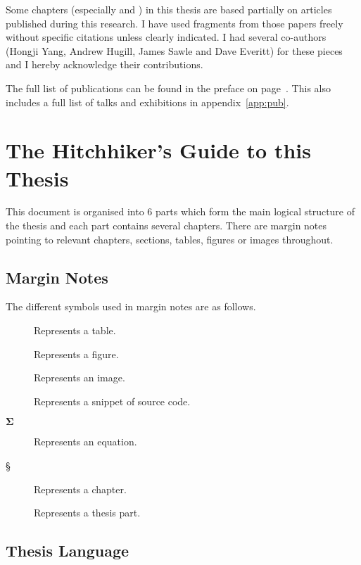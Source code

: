 Some chapters (especially  and ) in this thesis are based partially on articles published during this research. I have used fragments from those papers freely without specific citations unless clearly indicated. I had several co-authors (Hongji Yang, Andrew Hugill, James Sawle and Dave Everitt) for these pieces and I hereby acknowledge their contributions.

The full list of publications can be found in the preface on page~\pageref{pre:pub}. This also includes a full list of talks and exhibitions in appendix~\ref{app:pub}.


\section{The Hitchhiker's Guide to this Thesis}

This document is organised into \num{6} parts which form the main logical structure of the thesis and each part contains several chapters. There are margin notes pointing to relevant chapters, sections, tables, figures or images throughout.


\subsection{Margin Notes}

The different symbols used in margin notes are as follows.

\begin{description}
  \item [] Represents a table.
  \item [] Represents a figure.
  \item [] Represents an image.
  \item [] Represents a snippet of source code.
  \item [$\bm{\Sigma}$] Represents an equation.
  \item [§] Represents a chapter.
  \item [\textspiral] Represents a thesis part.
\end{description}


\subsection{Thesis Language}

